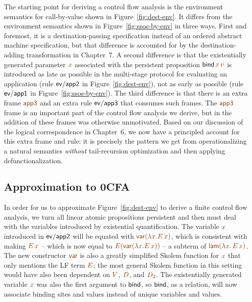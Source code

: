 The starting point for deriving a control flow analysis is the
environment semantics for call-by-value shown in
Figure~\ref{fig:dest-env}. It differs from the environment semantics
shown in Figure~\ref{fig:ssos-by-env} in three ways. First and
foremost, it is a destination-passing specification instead of an
ordered abstract machine specification, but that difference is
accounted for by the destination-adding transformation in Chapter~7.
A second difference is that the existentially generated parameter
$\lf{x}$ associated with the persistent proposition ${\sf
  bind}\,\lf{x}\,\lf{v}$ is introduced as late as possible in the
multi-stage protocol for evaluating an application (rule ${\sf
  ev/app2}$ in Figure~\ref{fig:dest-env}), not as early as possible
(rule ${\sf ev/app1}$ in Figure~\ref{fig:ssos-by-env}). The third
difference is that there is an extra frame $\lf{\sf app3}$ and an
extra rule ${\sf ev/app3}$ that consumes such frames. The $\lf{\sf
  app3}$ frame is an important part of the control flow analysis we
derive, but in \cite{simmons11logical} the addition of these frames
was otherwise unmotivated. Based on our discussion of the logical
correspondence in Chapter~6, we now have a principled account for this
extra frame and rule: it is precisely the pattern we get from
operationalizing a natural semantics {\it without} tail-recursion
optimization and then applying defunctionalization.

\subsection{Approximation to 0CFA}

In order for us to approximate Figure~\ref{fig:dest-env} to derive a
finite control flow analysis, we turn all linear atomic propositions
persistent and then must deal with the variables introduced by
existential quantification. The variable $\lf{x}$ introduced in ${\sf
  ev/app2}$ will be equated with $\lf{{\sf var}(\lambda x.E\,x)}$,
which is consistent with making $\lf{E\,x}$ -- which is now equal to
$\lf{E({\sf var}(\lambda x.E\,x))}$ -- a subterm of $\lf{{\sf lam}(\lambda x.\, E\,x)}$.  The new
constructor $\lf{\sf var}$ is also a greatly simplified Skolem
function for $\lf{x}$ that only mentions the LF term $\lf{E}$; the
most general Skolem function in this setting would have also been
dependent on $\lf{V}$, $\lf{D}$, and $\lf{D_2}$. The existentially
generated variable $\lf x$ was also the first argument to ${\sf bind}$,
so ${\sf bind}$, as a relation, will now associate binding sites
and values instead of unique variables and values. 

